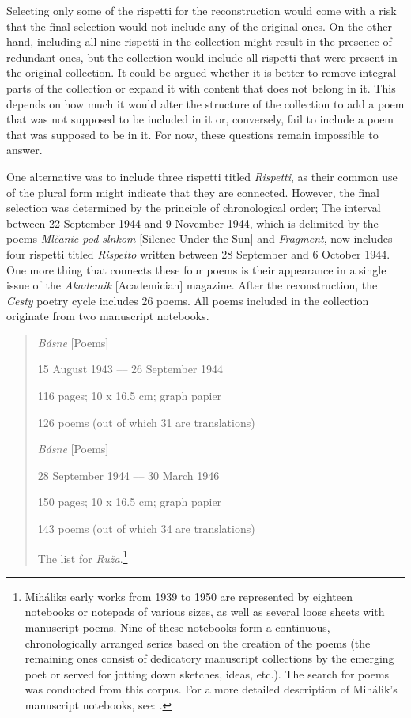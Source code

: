 \begin{paper}
Selecting only some of the rispetti for the reconstruction would come
with a risk that the final selection would not include any of the
original ones. On the other hand, including all nine rispetti in the
collection might result in the presence of redundant ones, but the
collection would include all rispetti that were present in the original
collection. It could be argued whether it is better to remove integral
parts of the collection or expand it with content that does not belong
in it. This depends on how much it would alter the structure of the
collection to add a poem that was not supposed to be included in it or,
conversely, fail to include a poem that was supposed to be in it. For
now, these questions remain impossible to answer.

One alternative was to include three rispetti titled \emph{Rispetti}, as
their common use of the plural form might indicate that they are
connected. However, the final selection was determined by the principle
of chronological order; The interval between 22 September 1944 and
9 November 1944, which is delimited by the poems \emph{Mlčanie pod
slnkom} [Silence Under the Sun] and \emph{Fragment}, now includes four
rispetti titled \emph{Rispetto} written between 28 September and
6 October 1944. One more thing that connects these four poems is their
appearance in a single issue of the \emph{Akademik} [Academician] magazine. After the reconstruction, the \emph{Cesty} poetry cycle
includes 26 poems. All poems included in the collection originate from
two manuscript notebooks.

\begin{quote}
\emph{Básne} [Poems]

15 August 1943 –– 26 September 1944

116 pages; 10 x 16.5 cm; graph papier

126 poems (out of which 31 are translations)

\hfill

\emph{Básne} [Poems]

28 September 1944 –– 30 March 1946

150 pages; 10 x 16.5 cm; graph papier

143 poems (out of which 34 are translations)

The list for \emph{Ruža}.\footnote{Mihálik\textquotesingle s early works
  from 1939 to 1950 are represented by eighteen notebooks or notepads of
  various sizes, as well as several loose sheets with manuscript poems.
  Nine of these notebooks form a continuous, chronologically arranged
  series based on the creation of the poems (the remaining ones consist
  of dedicatory manuscript collections by the emerging poet or served
  for jotting down sketches, ideas, etc.). The search for poems was
  conducted from this corpus. For a more detailed description of
  Mihálik's manuscript notebooks, see: \cite[17--21]{navratil_pramene_2019}.}
\end{quote}


\end{paper}
